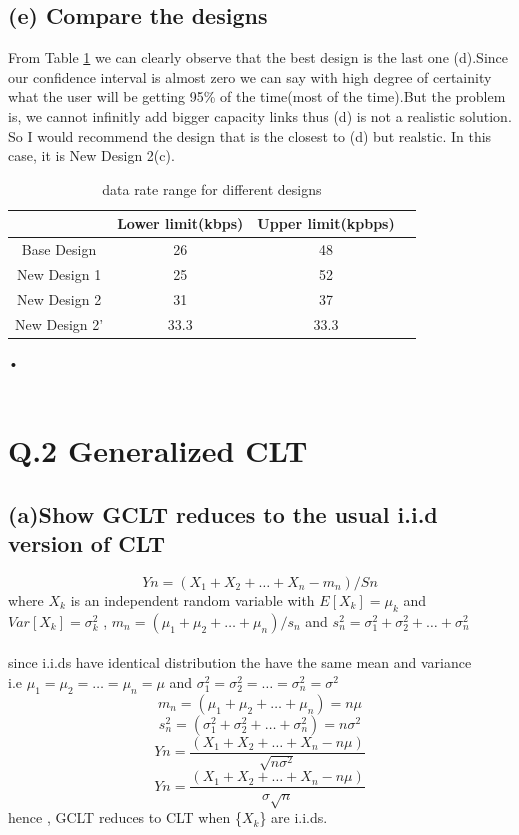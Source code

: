 \documentclass[a4paper,11pt]{article}
\begin{document}
\subsection*{(e) Compare the designs}
From Table \ref{tab:q1_e} we can clearly observe that the best design is the last one (d).Since our confidence interval is almost zero
we can say with high degree of certainity what the user will be getting 95\% of the time(most of the time).But the problem is, we cannot infinitly add bigger capacity links thus (d) is not a realistic solution.
So I would recommend the design that is the closest to (d) but realstic. In this case, it is New Design 2(c).
\begin{table}
\centering
\hspace*{-3cm}
\begin{tabular}{ |c|c|c|c|} 
\hline
&Lower limit(kbps) & Upper limit(kpbps)\\
\hline
Base Design & 26 & 48\\
\hline
New Design 1& 25 & 52\\
\hline
New Design 2& 31 & 37\\
\hline
New Design 2'& 33.3 &33.3\\
\hline
\end{tabular}
\caption{data rate range for different designs} \label{tab:q1_e}
\end{table}•\\\\
\newpage
\section*{Q.2 Generalized CLT}
\subsection*{(a)\quad Show GCLT reduces to the usual i.i.d version of CLT}
$$Yn = (X_1+X_2+ \dots +X_n-m_n)/Sn$$
where $X_k$ is an independent random variable with $E[X_k]=\mu_k$ and $Var[X_k]= \sigma_k^2$ ,
$m_n = (\mu_1+\mu_2+\dots +\mu_n)/s_n$ and $s_n^2=\sigma_1^2+\sigma_2^2+\dots+\sigma_n^2$\\\\
since i.i.ds have identical distribution the have the same mean and variance\\
i.e $\mu_1=\mu_2=\dots =\mu_n=\mu$ and $\sigma_1^2=\sigma_2^2=\dots=\sigma_n^2=\sigma^2$ \\
$$m_n = (\mu_1+\mu_2+\dots +\mu_n)=n\mu$$
$$s_n^2=(\sigma_1^2+\sigma_2^2+\dots+\sigma_n^2)=n\sigma^2$$
$$Yn = \frac{(X_1+X_2+ \dots +X_n-n\mu)}{\sqrt{n\sigma^2}}$$
$$Yn = \frac{(X_1+X_2+ \dots +X_n-n\mu)}{\sigma\sqrt{n}}$$
hence , GCLT reduces to CLT when \{$X_k$\} are i.i.ds.
\newpage
\end{document}
